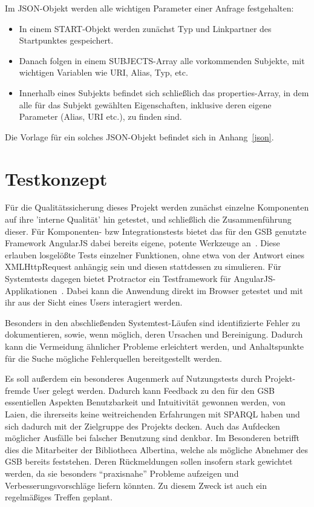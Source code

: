 Im JSON-Objekt werden alle wichtigen Parameter einer Anfrage
festgehalten:
\begin{itemize}
\item In einem START-Objekt werden zunächst Typ und Linkpartner des
Startpunktes gespeichert. 
\item Danach folgen in einem SUBJECTS-Array alle vorkommenden
  Subjekte, mit wichtigen Variablen wie URI, Alias, Typ, etc. 
\item Innerhalb eines Subjekts befindet sich schließlich das properties-Array, in dem alle für das Subjekt gewählten Eigenschaften, inklusive deren eigene Parameter (Alias, URI etc.), zu finden sind.
\end{itemize}

Die Vorlage für ein solches JSON-Objekt befindet sich in Anhang~\ref{json}.

\section{Testkonzept}

Für die Qualitätssicherung dieses Projekt werden zunächst einzelne
Komponenten auf ihre 'interne Qualität' hin getestet, und schließlich
die Zusammenführung dieser. Für Komponenten- bzw Integrationstests
bietet das für den GSB genutzte Framework AngularJS dabei bereits
eigene, potente Werkzeuge an~\cite{ajsut}. Diese erlauben losgelößte Tests
einzelner Funktionen, ohne etwa von der Antwort eines XMLHttpRequest
anhängig sein und diesen stattdessen zu simulieren. Für Systemtests
dagegen bietet Protractor ein Testframework für
AngularJS-Applikationen~\cite{prot}. Dabei kann die Anwendung direkt im
Browser getestet und mit ihr aus der Sicht eines Users interagiert
werden.

Besonders in den abschließenden Systemtest-Läufen sind identifizierte
Fehler zu dokumentieren, sowie, wenn möglich, deren Ursachen und
Bereinigung. Dadurch kann die Vermeidung ähnlicher Probleme
erleichtert werden, und Anhaltspunkte für die Suche mögliche
Fehlerquellen bereitgestellt werden.

Es soll außerdem ein besonderes Augenmerk auf Nutzungstests durch
Projekt-fremde User gelegt werden. Dadurch kann Feedback zu den für
den GSB essentiellen Aspekten Benutzbarkeit und Intuitivität gewonnen
werden, von Laien, die ihrerseits keine weitreichenden Erfahrungen mit
SPARQL haben und sich dadurch mit der Zielgruppe des Projekts
decken. Auch das Aufdecken möglicher Ausfälle bei falscher Benutzung
sind denkbar.
Im Besonderen betrifft dies die Mitarbeiter der Bibliotheca Albertina,
welche als mögliche Abnehmer des GSB bereits feststehen. Deren
Rückmeldungen sollen insofern stark gewichtet werden, da sie besonders
“praxisnahe” Probleme aufzeigen und Verbesserungsvorschläge liefern
könnten. Zu diesem Zweck ist auch ein regelmäßiges Treffen geplant.






